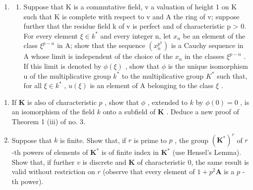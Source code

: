 \begin{enumerate}
\def\labelenumi{\arabic{enumi}.}
\setcounter{enumi}{4}
\tightlist
\item
  \begin{enumerate}
  \def\labelenumii{(\alph{enumii})}
  \tightlist
  \item
    Suppose that K is a commutative field, v a valuation of height 1 on K such that K is complete with respect to v and A the ring of v; suppose further that the residue field k of v is perfect and of characteristic p \textgreater{} 0. For every element \(\xi \in k^{*}\) and every integer n, let \(x_{n}\) be an element of the class \(\xi^{p-n}\) in A; show that the sequence \((x_{n}^{p^{n}})\) is a Cauchy sequence in A whose limit is independent of the choice of the \(x_{n}\) in the classes \(\xi^{p-n}\) . If this limit is denoted by \(\phi(\xi)\) , show that \(\phi\) is the unique isomorphism u of the multiplicative group \(k^{*}\) to the multiplicative group \(K^{*}\) such that, for all \(\xi \in k^{*}\) , \(u(\xi)\) is an element of A belonging to the class \(\xi\) .
  \end{enumerate}
\end{enumerate}

\begin{enumerate}
\def\labelenumi{(\alph{enumi})}
\setcounter{enumi}{1}
\item
  If \(\mathbf{K}\) is also of characteristic \(p\) , show that \(\phi\) , extended to \(k\) by \(\phi(0) = 0\) , is an isomorphism of the field \(k\) onto a subfield of \(\mathbf{K}\) . Deduce a new proof of Theorem 1 (iii) of no. 3.
\item
  Suppose that \(k\) is finite. Show that, if \(r\) is prime to \(p\) , the group \((\mathbf{K}^*)^r\) of \(r\) -th powers of elements of \(\mathbf{K}^*\) is of finite index in \(\mathbf{K}^*\) (use Hensel's Lemma). Show that, if further \(v\) is discrete and \(\mathbf{K}\) of characteristic 0, the same result is valid without restriction on \(r\) (observe that every element of \(1 + p^2\mathbf{A}\) is a \(p\) -th power).
\end{enumerate}

